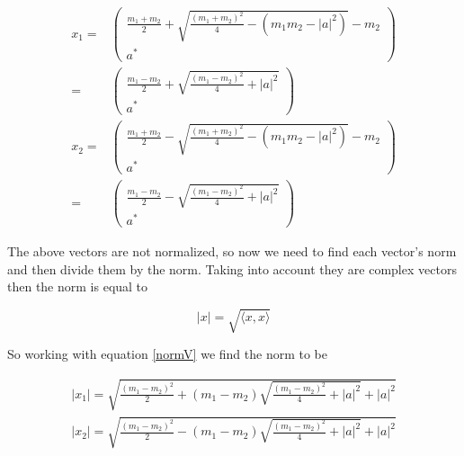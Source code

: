 \documentclass[11pt,letterpaper]{article}%
\newcommand\abs[1]{\left|#1\right|}
\newcommand\inn[2]{\langle#1,#2\rangle}
\begin{document}
\begin{enumerate}[label=\Large{\textbf{\arabic*.}}]
{\begin{enumerate}[label=\textit{\roman*.}]
{\begin{equation}
\label{eigenvectors}
\begin{split}
x_1 =& 
\begin{pmatrix}
\frac{m_1 + m_2}{2} + \sqrt{\frac{(m_1 + m_2)^2}{4} - \left( m_1m_2 - \abs{a}^2 \right)} - m_2\\
a^*
\end{pmatrix}\\
=& \begin{pmatrix}
\frac{m_1 - m_2}{2} + \sqrt{\frac{(m_1 - m_2)^2}{4} + \abs{a}^2}\\
a^*
\end{pmatrix}\\
x_2 =&
\begin{pmatrix}
\frac{m_1 + m_2}{2} - \sqrt{\frac{(m_1 + m_2)^2}{4} - \left( m_1m_2 - \abs{a}^2 \right)} - m_2\\
a^*
\end{pmatrix}\\
=& \begin{pmatrix}
\frac{m_1 - m_2}{2} - \sqrt{\frac{(m_1 - m_2)^2}{4} + \abs{a}^2}\\
a^*
\end{pmatrix}
\end{split}
\end{equation}

The above vectors are not normalized, so now we need to find each vector's norm and then divide them by the norm. Taking into account they are complex vectors then the norm is equal to

\begin{equation}
\label{normV}
\abs{x} = \sqrt{\inn{x}{x}}
\end{equation}

So working with equation \eqref{normV} we find the norm to be

\begin{equation}
\label{normVV}
\begin{split}
\abs{x_1} = \sqrt{\frac{(m_1 - m_2)^2}{2} + (m_1 - m_2)\sqrt{\frac{(m_1 - m_2)^2}{4} + \abs{a}^2} + \abs{a}^2}\\
\abs{x_2} = \sqrt{\frac{(m_1 - m_2)^2}{2} - (m_1 - m_2)\sqrt{\frac{(m_1 - m_2)^2}{4} + \abs{a}^2} + \abs{a}^2}
\end{split}
\end{equation}

}
\end{enumerate}}
\end{enumerate}
\end{document}
